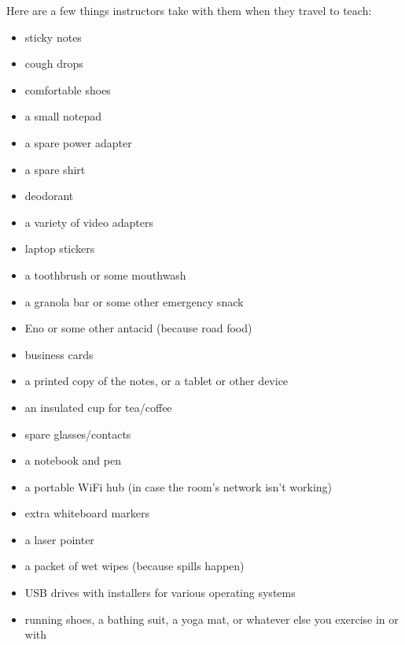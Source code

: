 Here are a few things instructors take with them when they travel to
teach:

\begin{itemize}
\item
  sticky notes
\item
  cough drops
\item
  comfortable shoes
\item
  a small notepad
\item
  a spare power adapter
\item
  a spare shirt
\item
  deodorant
\item
  a variety of video adapters
\item
  laptop stickers
\item
  a toothbrush or some mouthwash
\item
  a granola bar or some other emergency snack
\item
  Eno or some other antacid (because road food)
\item
  business cards
\item
  a printed copy of the notes, or a tablet or other device
\item
  an insulated cup for tea/coffee
\item
  spare glasses/contacts
\item
  a notebook and pen
\item
  a portable WiFi hub (in case the room's network isn't working)
\item
  extra whiteboard markers
\item
  a laser pointer
\item
  a packet of wet wipes (because spills happen)
\item
  USB drives with installers for various operating systems
\item
  running shoes, a bathing suit, a yoga mat, or whatever else you
  exercise in or with
\end{itemize}
